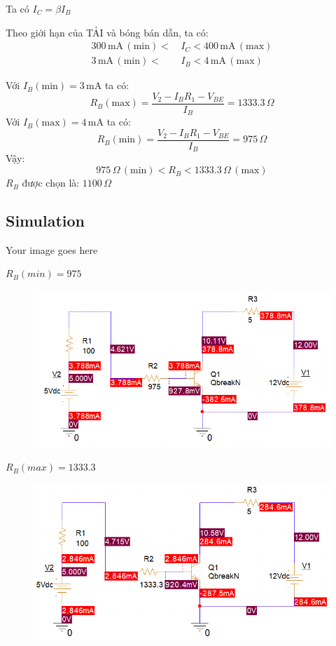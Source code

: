 Ta có $I_C=\beta I_B$

Theo giới hạn của TẢI và bóng bán dẫn, ta có:
\begin{align*}
    300 \, \text{mA} \, (\text{min}) <\, &I_C < 400 \, \text{mA} \, (\text{max})\\
    3 \, \text{mA} \, (\text{min}) <\, &I_B < 4 \, \text{mA} \, (\text{max})
\end{align*}

Với \( I_B (\text{min}) = 3 \, \text{mA} \) ta có:
\[
R_B (\text{max}) = \frac{V_2 - I_BR_1 - V_{BE}}{I_B} =1333.3 \, \Omega
\]
Với \( I_B (\text{max}) = 4 \, \text{mA} \) ta có:
\[
R_B (\text{min}) = \frac{V_2 - I_BR_1 - V_{BE}}{I_B} = 975 \, \Omega
\]
Vậy:
\[
975 \, \Omega \, (\text{min}) < R_B < 1333.3 \, \Omega \, (\text{max})
\]
$R_B$ được chọn là: \( 1100 \, \Omega \)

\subsection{Simulation}

Your image goes here

$R_B (min) = 975$
\begin{figure}[h]
    \centering
    \includegraphics[width=12cm]{graphics/ex4/f2.PNG}
\end{figure}
\newpage
$R_B (max) = 1333.3$
\begin{figure}[h]
    \centering
    \includegraphics[width=12cm]{graphics/ex4/f3.PNG}
\end{figure}

